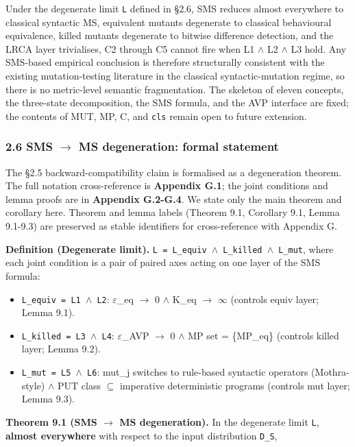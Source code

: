 \documentclass[review,12pt,authoryear]{elsarticle}
\providecommand{\tightlist}{\setlength{\itemsep}{0pt}\setlength{\parskip}{0pt}}
\begin{document}
Under the degenerate limit \texttt{L} defined in §2.6, SMS reduces
almost everywhere to classical syntactic MS, equivalent mutants
degenerate to classical behavioural equivalence, killed mutants
degenerate to bitwise difference detection, and the LRCA layer
trivialises, C2 through C5 cannot fire when L1 $\wedge$ L2 $\wedge$ L3 hold. Any
SMS-based empirical conclusion is therefore structurally consistent with
the existing mutation-testing literature in the classical
syntactic-mutation regime, so there is no metric-level semantic
fragmentation. The skeleton of eleven concepts, the three-state
decomposition, the SMS formula, and the AVP interface are fixed; the
contents of MUT, MP, C, and \texttt{cls} remain open to future
extension.

\subsubsection{2.6 SMS $\to$ MS degeneration: formal statement}\label{sms-ms-degeneration-formal-statement}

The §2.5 backward-compatibility claim is formalised as a degeneration
theorem. The full notation cross-reference is \textbf{Appendix G.1}; the
joint conditions and lemma proofs are in \textbf{Appendix G.2-G.4}. We
state only the main theorem and corollary here. Theorem and lemma labels
(Theorem 9.1, Corollary 9.1, Lemma 9.1-9.3) are preserved as stable
identifiers for cross-reference with Appendix G.

\textbf{Definition (Degenerate limit).}
\texttt{L\ =\ L\_equiv\ $\wedge$\ L\_killed\ $\wedge$\ L\_mut}, where each joint
condition is a pair of paired axes acting on one layer of the SMS
formula:

\begin{itemize}
\tightlist
\item
  \texttt{L\_equiv\ =\ L1\ $\wedge$\ L2}: $\varepsilon$\_eq $\to$ 0 $\wedge$ K\_eq $\to$ $\infty$ (controls equiv
  layer; Lemma 9.1).
\item
  \texttt{L\_killed\ =\ L3\ $\wedge$\ L4}: $\varepsilon$\_AVP $\to$ 0 $\wedge$ MP set = \{MP\_eq\}
  (controls killed layer; Lemma 9.2).
\item
  \texttt{L\_mut\ =\ L5\ $\wedge$\ L6}: mut\_j switches to rule-based syntactic
  operators (Mothra-style) $\wedge$ PUT class $\subseteq$ imperative deterministic
  programs (controls mut layer; Lemma 9.3).
\end{itemize}

\textbf{Theorem 9.1 (SMS $\to$ MS degeneration).} In the degenerate limit
\texttt{L}, \textbf{almost everywhere} with respect to the input
distribution \texttt{D\_S},
\end{document}
